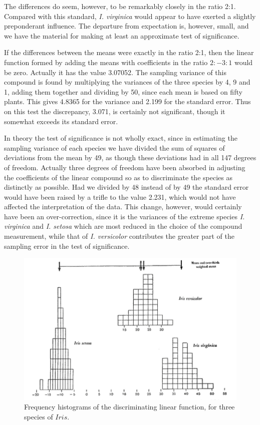 \documentclass[12pt]{article}
\begin{document}
The differences do seem, however, to be remarkably closely in the ratio 2:1. Compared with this standard, \textit{I. virginica} would appear to have exerted a slightly preponderant influence. The departure from expectation is, however, small, and we have the material for making at least an approximate test of significance.

If the differences between the means were exactly in the ratio 2:1, then the linear function formed by adding the means with coefficients in the ratio $2:-3:1$ would be zero. Actually it has the value 3.07052. The sampling variance of this compound is found by multiplying the variances of the three species by 4, 9 and 1, adding them together and dividing by 50, since each mean is based on fifty plants. This gives 4.8365 for the variance and 2.199 for the standard error. Thus on this test the discrepancy, 3.071, is certainly not significant, though it somewhat exceeds its standard error.

In theory the test of significance is not wholly exact, since in estimating the sampling variance of each species we have divided the sum of squares of deviations from the mean by 49, as though these deviations had in all 147 degrees of freedom. Actually three degrees of freedom have been absorbed in adjusting the coefficients of the linear compound so as to discriminate the species as distinctly as possible. Had we divided by 48 instead of by 49 the standard error would have been raised by a trifle to the value 2.231, which would not have affected the interpretation of the data. This change, however, would certainly have been an over-correction, since it is the variances of the extreme species \textit{I. virginica} and \textit{I. setosa} which are most reduced in the choice of the compound measurement, while that of \textit{I. versicolor} contributes the greater part of the sampling error in the test of significance.

\begin{figure}[!b]
\centering
\includegraphics[width=1\linewidth]{img.png}
\caption{Frequency histograms of the discriminating linear function, for three species of \(Iris\).}
\label{fig:1}
\end{figure}
\end{document}
